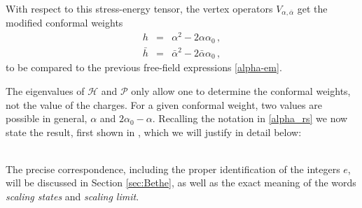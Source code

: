 \documentclass[a4paper,10pt]{article}
\newcommand{\linnea}[1]{$\framebox{\tiny L}$\ \textbf{\texttt{{\color{red}\footnotesize#1}}}}
\newcommand{\Hlatt}{\mathcal{H}}
\newcommand{\Platt}{\mathcal{P}}
\begin{document}
With respect to this stress-energy tensor, the vertex operators $V_{\alpha,\bar{\alpha}}$ get the modified conformal weights 
\begin{subequations}\label{twisted_weights}
\begin{eqnarray}
 h &=& \alpha^2-2\alpha\alpha_0 \,, \\
 \bar{h} &=& \bar{\alpha}^2-2\bar{\alpha}\alpha_0 \,,
\end{eqnarray}
\end{subequations}
to be compared to the previous free-field expressions \eqref{alpha-em}.


%
%
The eigenvalues of $\Hlatt$ and $\Platt$  only allow one to determine the conformal weights, not the value of the charges. For a given conformal weight, two values are possible in general, $\alpha$ and $2\alpha_0-\alpha$. Recalling the notation in \eqref{alpha_rs} we now state the result, first shown in \cite{KooSaleur}, which we will justify in detail below:

\vspace*{5pt}
\noindent{}
\vspace*{5pt}
~\\
The precise correspondence, including the proper identification of the integers $e$, will be discussed in Section \ref{sec:Bethe}, as well as the exact meaning of the words {\em scaling states} and {\em scaling limit}.
\end{document}
